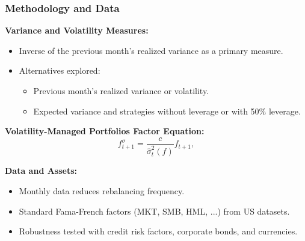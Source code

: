 \documentclass[9pt]{beamer}  %
\begin{document}
\begin{frame}
    \frametitle{Methodology and Data}  %
    
    \textbf{Variance and Volatility Measures:}  %
    \begin{itemize}  %
        \item Inverse of the previous month’s realized variance as a primary measure.
        \item Alternatives explored:
        \begin{itemize}  %
            \item Previous month’s realized variance or volatility.
            \item Expected variance and strategies without leverage or with 50\% leverage.
        \end{itemize}
    \end{itemize}
    
    \vspace{0.5cm}  %
    
    \textbf{Volatility-Managed Portfolios Factor Equation:}  %
    \begin{equation*}
    f^{\sigma}_{t+1} = \frac{c}{\hat{\sigma}^2_t(f)} f_{t+1},  %
    \end{equation*}

    \vspace{0.5cm}  %

    \textbf{Data and Assets:}  %
    \begin{itemize}  %
        \item Monthly data reduces rebalancing frequency.
        \item Standard Fama-French factors (MKT, SMB, HML, ...) from US datasets.
        \item Robustness tested with credit risk factors, corporate bonds, and currencies.
    \end{itemize}
\end{frame}
\end{document}
